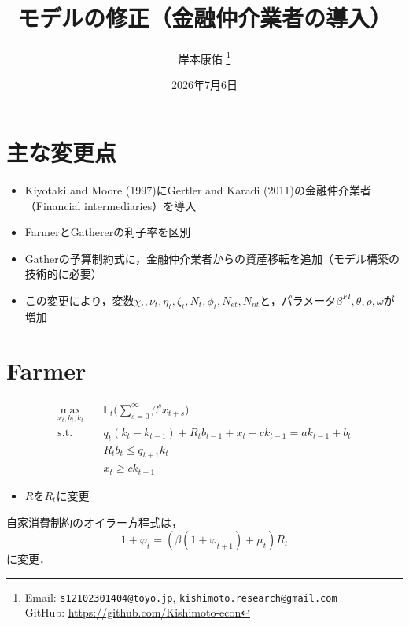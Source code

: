 \documentclass[dvipdfmx]{jlreq}
\title{
\vspace{-4cm}
モデルの修正（金融仲介業者の導入）
}
\author{
  岸本康佑
  \thanks{
  Email: \texttt{s12102301404@toyo.jp}, \texttt{kishimoto.research@gmail.com} \\
  GitHub: \url{https://github.com/Kishimoto-econ}
}}
\date{2026年7月6日}
\begin{document}
\maketitle

\section{主な変更点}
\begin{itemize}
  \item Kiyotaki and Moore (1997)にGertler and Karadi (2011)の金融仲介業者（Financial intermediaries）を導入
  \item FarmerとGathererの利子率を区別
  \item Gatherの予算制約式に，金融仲介業者からの資産移転を追加（モデル構築の技術的に必要）
  \item この変更により，変数$\chi_t, \nu_t, \eta_t, \zeta_t, N_t, \phi_t, N_{et}, N_{nt}$と，パラメータ$\beta^{FI}, \theta, \rho, \omega$が増加
\end{itemize}

\section{Farmer}
\begin{align}
  \max_{x_t, b_t, k_t} \quad & \mathbb{E}_t \bigg( \sum_{s=0}^{\infty} \beta^s x_{t+s} \bigg) \label{eq:f_u} \\
  \text{s.t.} \quad & q_t(k_t - k_{t-1}) + R_t b_{t-1} + x_t - c k_{t-1} = a k_{t-1} + b_t \label{eq:f_yosan} \\
  & R_t b_t \leq q_{t+1} k_t \label{eq:kariire}\\
  & x_t \geq c k_{t-1} \label{eq:syouhi}
\end{align}
\begin{itemize}
  \item $R$を$R_t$に変更
\end{itemize}
自家消費制約のオイラー方程式は，
\begin{equation}
  1 + \varphi_t = (\beta(1+\varphi_{t+1}) + \mu_t) R_t
\end{equation}
に変更．
\end{document}
